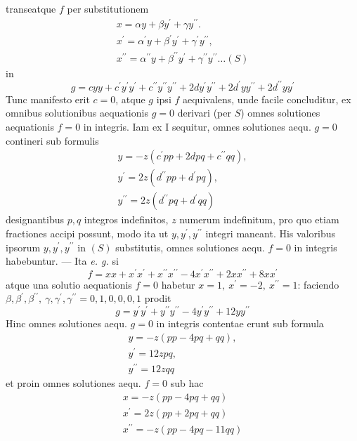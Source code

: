 transeatque \(f\) per substitutionem 
\[\begin{gathered}x=\alpha y+\beta y^\prime+\gamma y^{\prime\prime}.\\ x^\prime=\alpha^\prime y+\beta^\prime y^\prime+\gamma^\prime y^{\prime\prime},\\ x^{\prime\prime}=\alpha^{\prime\prime}y+\beta^{\prime\prime}y^\prime+\gamma^{\prime\prime}y^{\prime\prime}\ldots(S)\end{gathered}\]
 in 
\[g=cyy+c^\prime y^\prime y^\prime+c^{\prime\prime}y^{\prime\prime}y^{\prime\prime}+2dy^\prime y^{\prime\prime}+2d^\prime yy^{\prime\prime}+2d^{\prime\prime}yy^\prime\]
 Tunc manifesto erit \(c=0\), atque \(g\) ipsi \(f\) aequivalens, unde facile concluditur, ex omnibus solutionibus aequationis \(g=0\) derivari (per \(S\)) omnes solutiones aequationis \(f=0\) in integris. Iam ex I sequitur, omnes solutiones aequ. \(g=0\) contineri sub formulis 
\[\begin{gathered}y=-z(c^\prime pp+2dpq+c^{\prime\prime}qq),\\ y^\prime=2z(d^{\prime\prime}pp+d^\prime pq),\\ y^{\prime\prime}=2z(d^{\prime\prime}pq+d^\prime qq)\end{gathered}\]
 designantibus \(p,q\) integros indefinitos, \(z\) numerum indefinitum, pro quo etiam fractiones accipi possunt, modo ita ut \(y,y^\prime,y^{\prime\prime}\) integri maneant. His valoribus ipsorum \(y,y^\prime,y^{\prime\prime}\) in \((S)\) substitutis, omnes solutiones aequ. \(f=0\) in integris habebuntur. — Ita \textit{e. g.} si 
\[f=xx+x^\prime x^\prime+x^{\prime\prime}x^{\prime\prime}-4x^\prime x^{\prime\prime}+2xx^{\prime\prime}+8xx^\prime\]
 atque una solutio aequationis \(f=0\) habetur \(x=1,\ x^\prime=-2,\ x^{\prime\prime}=1\): faciendo \(\beta,\beta^\prime,\beta^{\prime\prime},\ \gamma,\gamma^\prime,\gamma^{\prime\prime}=0,1,0,0,0,1\) prodit 
\[g=y^\prime y^\prime+y^{\prime\prime}y^{\prime\prime}-4y^\prime y^{\prime\prime}+12yy^{\prime\prime}\]
 Hinc omnes solutiones aequ. \(g=0\) in integris contentae erunt sub formula 
\[\begin{gathered}y=-z(pp-4pq+qq),\\ y^\prime=12zpq,\\ y^{\prime\prime}=12zqq\end{gathered}\]
 et proin omnes solutiones aequ. \(f=0\) sub hac 
\[\begin{gathered}x=-z(pp-4pq+qq)\\x^\prime=2z(pp+2pq+qq)\\x^{\prime\prime}=-z(pp-4pq-11qq)\end{gathered}\]


